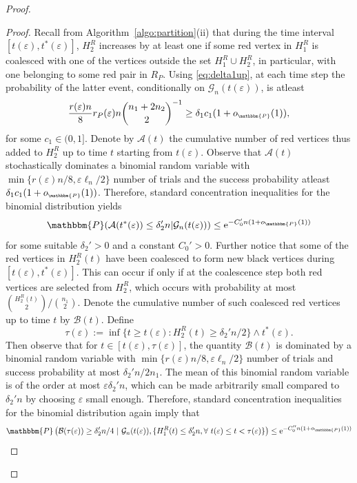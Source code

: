 \documentclass[11pt,a4paper, reqno]{article}
\numberwithin{equation}{section}
\numberwithin{equation}{section}
\def\sss{\scriptscriptstyle}
\newcommand{\prob}[1]{\ensuremath{\mathbbm{P}\left(#1\right)}}
\newcommand{\PR}{\ensuremath{\mathbbm{P}}}
\newcommand{\e}{\ensuremath{\mathrm{e}}}
\newcommand{\1}{\ensuremath{\mathbbm{1}}}
\newcommand{\oP}{\ensuremath{o_{\sss\PR}}}
\newenvironment{claimproof}{\begin{proof}\renewcommand{\qedsymbol}{\claimqed}}{\end{proof}\renewcommand{\qedsymbol}{\plainqed}}
\let\plainqed\qedsymbol
\newcommand{\claimqed}{$\lrcorner$}
\numberwithin{equation}{section}
\numberwithin{theorem}{section}
\begin{document}
\begin{proof}
\begin{claimproof}
Recall from Algorithm~\ref{algo:partition}(ii) that during the time interval $[t(\varepsilon), t^*(\varepsilon)]$, $H_2^R$ increases by at least one if some red vertex in $H_1^R$ is coalesced with one of the vertices outside the set $H_1^R\cup H_2^R$, in particular, with one belonging to some red pair in $R_P$. 
Using \eqref{eq:delta1up}, at each time step the probability of the latter event, conditionally on $\mathcal{G}_n(t(\varepsilon))$,  is atleast 
$$\frac{r(\varepsilon)n}{8}r_P(\varepsilon)n{n_1 + 2 n_2\choose 2}^{-1}\geq \delta_1 c_1(1+\oP(1)),$$
for some $c_1\in (0,1]$.
Denote by $\mathcal{A}(t)$ the cumulative number of red vertices thus added to $H_2^R$ up to time $t$ starting from $t(\varepsilon)$.
 Observe that $\mathcal{A}(t)$ stochastically dominates a binomial random variable with $\min\{r(\varepsilon) n/8,\varepsilon\ell_n/2\}$ number of trials and the success probability atleast $\delta_1 c_1(1+\oP(1))$. 
Therefore, standard concentration inequalities for the binomial distribution \cite[Corollary 2.3]{JLR00} yields 
\begin{equation}\label{eq:bound-deg-1-A}
\PR(\mathcal{A}(t^*(\varepsilon))\leq \delta_2' n|\mathcal{G}_n(t(\varepsilon)))\leq \e^{-C_0'n (1+\oP(1))}
\end{equation}
for some suitable $\delta_2'>0$ and a constant $C_0'>0$.
Further notice that some of the red vertices in $H_2^R(t)$ have been coalesced to form new black vertices during $[t(\varepsilon),t^*(\varepsilon)]$.
This can occur if only if at the coalescence step both red vertices are selected from $H_2^R$, which occurs with probability at most ${H_2^R(t)\choose 2}/{n_1\choose 2}$.
Denote the cumulative number of such coalesced red vertices up to time $t$ by $\mathcal{B}(t)$. 
Define 
$$\tau(\varepsilon):= \inf\{t\geq t(\varepsilon): H_2^R(t) \geq  \delta_2'n/2\}\wedge t^*(\varepsilon).$$
Then observe that for $t\in [t(\varepsilon), \tau(\varepsilon)]$, the quantity $\mathcal{B}(t)$ is dominated by a binomial random variable  with $\min\{r(\varepsilon) n/8,\varepsilon\ell_n/2\}$ number of trials and success probability at most $\delta_2' n/2n_1$. 
The mean of this binomial random variable is of the order at most $\varepsilon\delta_2'n$, which can be made arbitrarily small compared to $\delta_2'n$ by choosing $\varepsilon$ small enough.
Therefore, standard concentration inequalities for the binomial distribution again imply that 
\begin{equation}\label{eq:bound-deg-1-B}
\prob{\mathcal{B}(\tau(\varepsilon))\geq \delta_2'n/4\ \vert\  \mathcal{G}_n(t(\varepsilon)), \{H_1^R(t) \leq  \delta_2'n,\forall\ t(\varepsilon) \leq t < \tau(\varepsilon)\}}\leq \e^{-C_0''n(1+\oP(1))}

\end{equation}
\end{claimproof}
\end{proof}
\end{document}
